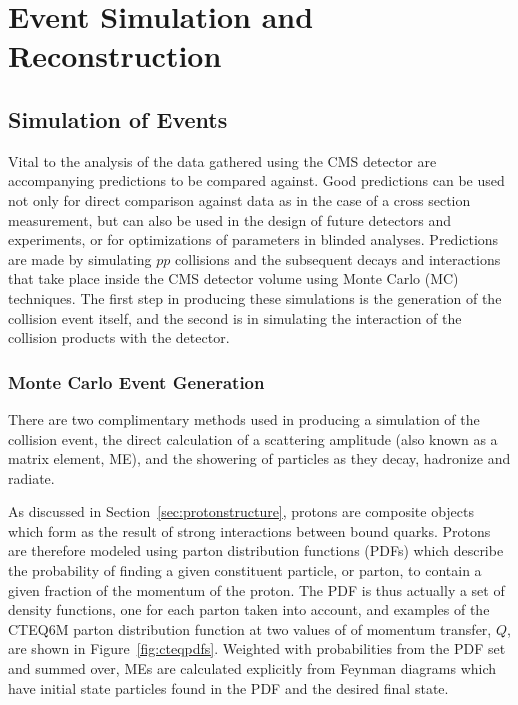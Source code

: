   


\chapter{Event Simulation and Reconstruction}\label{sec:simulation}
\section{Simulation of Events}
 Vital to the analysis of the data
  gathered using the CMS detector
  are accompanying predictions to be compared against.
 Good predictions can be used not only 
  for direct comparison against data
  as in the case of a cross section measurement,
  but can also be used in the design of 
  future detectors and experiments,
  or for optimizations of parameters in blinded analyses.
 Predictions are made by 
  simulating $pp$ collisions and the subsequent
  decays and interactions that take place
  inside the CMS detector volume
  using Monte Carlo (MC) techniques.
 The first step in producing these simulations
  is the generation of the collision event
  itself, and the second
  is in simulating the interaction of the
  collision products with the detector.

\subsection{Monte Carlo Event Generation}
 There are two complimentary methods used
  in producing a simulation of the 
  collision event, the direct calculation 
  of a scattering amplitude
  (also known as a matrix element, ME),
  and the showering of particles as they
  decay, hadronize and radiate.

 As discussed in Section~\ref{sec:protonstructure},
  protons are composite objects which form
  as the result of strong 
  interactions between bound quarks.
 Protons are therefore modeled using 
  parton distribution functions (PDFs)
  which describe the probability of
  finding a given constituent particle,
  or parton, to contain a given fraction
  of the momentum of the proton.
 The PDF is thus actually a set of density functions,
  one for each parton taken into account,
  and examples of the CTEQ6M parton distribution
  function at two values of of momentum transfer, $Q$,
  are shown in Figure~\ref{fig:cteqpdfs}.
 Weighted with probabilities from the PDF set
  and summed over,
  MEs are calculated explicitly from Feynman
  diagrams which have initial state particles
  found in the PDF and the desired
  final state. 
 

